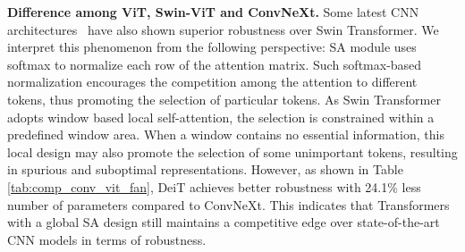 \documentclass[nohyperref]{article}
\theoremstyle{plain}
\theoremstyle{definition}
\theoremstyle{remark}
\begin{document}
\vspace{-3mm}
\textbf{Difference among ViT, Swin-ViT and ConvNeXt.} Some latest CNN architectures~\cite{liu2022convnet} have also shown superior robustness over Swin Transformer. We interpret this phenomenon from the following perspective: SA module uses softmax to normalize each row of the attention matrix. Such softmax-based normalization encourages the competition among the attention to different tokens, thus promoting the selection of particular tokens. As Swin Transformer adopts window based local self-attention, the selection is constrained within a predefined window area. When a window contains no essential information, this local design may also promote the selection of some unimportant tokens, resulting in spurious and suboptimal representations. 
However, as shown in Table \ref{tab:comp_conv_vit_fan}, DeiT achieves better robustness with 24.1\% less number of parameters compared to ConvNeXt. This indicates that Transformers with a global SA design still maintains a competitive edge over state-of-the-art CNN models in terms of robustness.





\begin{table}[h!]
\centering
\small
\caption{\textbf{Robustness comparison among Swin, ConvNeXt, DeiT and FAN}. The mIoU of ConvNeXt, DeiT, Swin and SegFormer models are our reproduced results. 
}
\label{tab:comp_conv_vit_fan}
\vspace{2mm}
\setlength{\tabcolsep}{2pt}
\vspace{-2mm}
\end{table}
\end{document}
